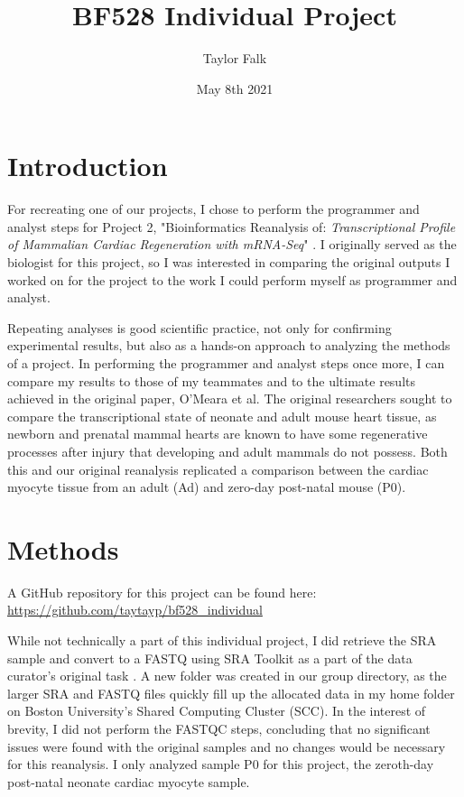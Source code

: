 \documentclass{article}
\title{BF528 Individual Project}
\author{Taylor Falk}
\date{May 8th 2021}
\begin{document}
\maketitle

\section{Introduction}
For recreating one of our projects, I chose to perform the programmer and analyst steps for Project 2, "Bioinformatics Reanalysis of: \textit{Transcriptional Profile of Mammalian Cardiac Regeneration with mRNA-Seq}" \cite{omearaTranscriptionalReversionCardiac2015}. I originally served as the biologist for this project, so I was interested in comparing the original outputs I worked on for the project to the work I could perform myself as programmer and analyst.

Repeating analyses is good scientific practice, not only for confirming experimental results, but also as a hands-on approach to analyzing the methods of a project. In performing the programmer and analyst steps once more, I can compare my results to those of my teammates and to the ultimate results achieved in the original paper, O'Meara et al. The original researchers sought to compare the transcriptional state of neonate and adult mouse heart tissue, as newborn and prenatal mammal hearts are known to have some regenerative processes after injury that developing and adult mammals do not possess. Both this and our original reanalysis replicated a comparison between the cardiac myocyte tissue from an adult (Ad) and zero-day post-natal mouse (P0).

\section{Methods}
A GitHub repository for this project can be found here: \url{https://github.com/taytayp/bf528_individual}

While not technically a part of this individual project, I did retrieve the SRA sample and convert to a FASTQ using SRA Toolkit as a part of the data curator's original task \cite{DownloadSoftwareSequence}. A new folder was created in our group directory, as the larger SRA and FASTQ files quickly fill up the allocated data in my home folder on Boston University's Shared Computing Cluster (SCC). In the interest of brevity, I did not perform the FASTQC steps, concluding that no significant issues were found with the original samples and no changes would be necessary for this reanalysis. I only analyzed sample P0 for this project, the zeroth-day post-natal neonate cardiac myocyte sample.
\end{document}
